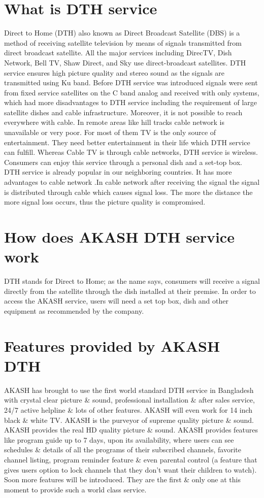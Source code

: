 \begin{spacing}{1.5}
\section{What is DTH service}
Direct to Home (DTH) also known as Direct Broadcast Satellite (DBS) is a method of receiving satellite television by means of signals transmitted from direct broadcast satellite. All the major services including DirecTV, Dish Network, Bell TV, Shaw Direct, and Sky use direct-broadcast satellites. DTH service ensures high picture quality and stereo sound as the signals are transmitted using Ku band.
Before DTH service was introduced signals were sent from fixed service satellites on the C band analog and received with only systems, which had more disadvantages to DTH service including the requirement of large satellite dishes and cable infrastructure. Moreover, it is not possible to reach everywhere with cable. In remote areas like hill tracks cable network is unavailable or very poor. For most of them TV is the only source of entertainment. They need better entertainment in their life which DTH service can fulfill. Whereas Cable TV is through cable networks, DTH service is wireless. Consumers can enjoy this service through a personal dish and a set-top box. DTH service is already popular in our neighboring countries. It has more advantages to cable network .In cable network after receiving the signal the signal is distributed through cable which causes signal loss. The more the distance the more signal loss occurs, thus the picture quality is compromised.
\section{How does AKASH DTH service work}
DTH stands for Direct to Home; as the name says, consumers will receive a signal directly from the satellite through the dish installed at their premise. In order to access the AKASH service, users will need a set top box, dish and other equipment as recommended by the company. 
\section{Features provided by AKASH DTH}
AKASH has brought to use the first world standard DTH service in Bangladesh with crystal clear picture \& sound, professional installation \& after sales service, 24/7 active helpline \& lots of other features. AKASH will even work for 14 inch black \& white TV. AKASH is the purveyor of supreme quality picture \& sound.  AKASH provides the real HD quality picture \& sound. AKASH provides features like program guide up to 7 days, upon its availability, where users can see schedules \& details of all the programs of their subscribed channels, favorite channel listing, program reminder feature \& even parental control (a feature that gives users option to lock channels that they don't want their children to watch). Soon more features will be introduced. They are the first \& only one at this moment to provide such a world class service.

\end{spacing}
